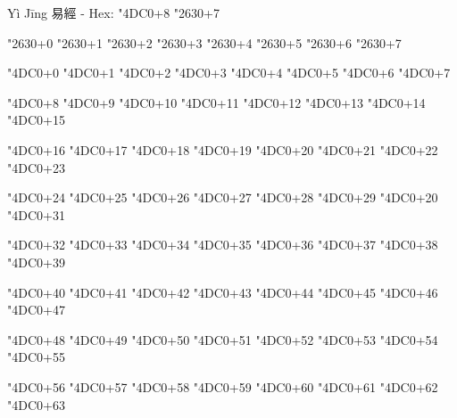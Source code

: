 \documentclass{article}
\newcommand{\iching}[1]{{\dejavusanszh\char\numexpr"4DC0+#1}}
\newcommand{\trigram}[1]{{\dejavusans\char\numexpr"2630+#1}}
\begin{document}
Yì Jīng 易經 - Hex: \iching{8} \trigram{7}

\trigram{0} \trigram{1} \trigram{2} \trigram{3}
\trigram{4} \trigram{5} \trigram{6} \trigram{7}


\iching{0}
\iching{1}
\iching{2}
\iching{3}
\iching{4}
\iching{5}
\iching{6}
\iching{7}

\iching{8}
\iching{9}
\iching{10}
\iching{11}
\iching{12}
\iching{13}
\iching{14}
\iching{15}

\iching{16}
\iching{17}
\iching{18}
\iching{19}
\iching{20}
\iching{21}
\iching{22}
\iching{23}

\iching{24}
\iching{25}
\iching{26}
\iching{27}
\iching{28}
\iching{29}
\iching{20}
\iching{31}

\iching{32}
\iching{33}
\iching{34}
\iching{35}
\iching{36}
\iching{37}
\iching{38}
\iching{39}

\iching{40}
\iching{41}
\iching{42}
\iching{43}
\iching{44}
\iching{45}
\iching{46}
\iching{47}

\iching{48}
\iching{49}
\iching{50}
\iching{51}
\iching{52}
\iching{53}
\iching{54}
\iching{55}

\iching{56}
\iching{57}
\iching{58}
\iching{59}
\iching{60}
\iching{61}
\iching{62}
\iching{63}
\end{document}
